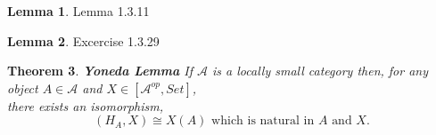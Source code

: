 \documentclass[18pt,a4paper]{article}
\newtheorem{theorem}{Theorem}[section]
\theoremstyle{definition}
\newtheorem{lemma}[theorem]{Lemma}
\begin{document}
	\begin{lemma}
		Lemma 1.3.11
	\end{lemma}
	\begin{lemma}
		Excercise 1.3.29
	\end{lemma}

	\begin{theorem}{\textbf{Yoneda Lemma}} %
		If $\mathcal{A} $ is a locally small category then, for any object $A \in \mathcal{A} $
		and $X \in [ \mathcal{A}^{op},Set]$,\\ there exists an isomorphism,
		\begin{equation} [ \mathcal{A} ^{op},Set ](H_A,X)\cong X(A) \text{ which is natural in } A \text{ and } X.\end{equation}
	\end{theorem}
\end{document}
